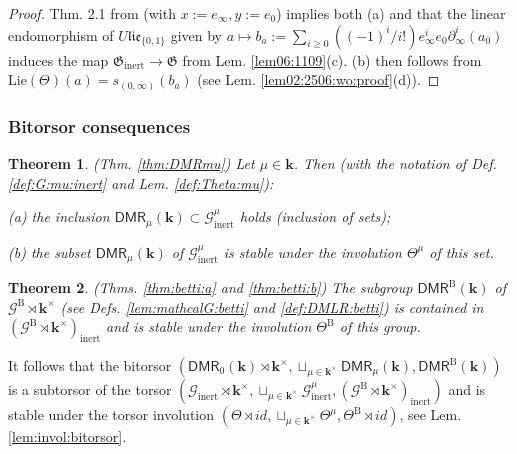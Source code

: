 \documentclass[10pt]{amsart}
\newtheorem{thm}{Theorem}[section]
\numberwithin{equation}{subsection}
\begin{document}
\begin{proof}
Thm. 2.1 from \cite{Sch1} (with $x:=e_\infty,y:=e_0$) implies both (a) and that 
the linear endomorphism of $U\mathfrak{lie}_{\{0,1\}}$ given by 
 $\textstyle a\mapsto b_a:=\sum_{i\geq0}((-1)^i/i!)e_\infty^ie_0\partial_\infty^i(a_0)$
induces the map $\mathfrak G_{\mathrm{inert}}\to \mathfrak G$ 
from Lem. \ref{lem06:1109}(c). (b) then follows from 
$\mathrm{Lie}(\Theta)(a)=s_{(0,\infty)}(b_a)$ (see Lem. \ref{lem02:2506:wo:proof}(d)). 
\end{proof}


\subsubsection{Bitorsor consequences}

\begin{thm}\label{thm:0:31:25jan} (Thm. \ref{thm:DMRmu})
  Let $\mu\in\mathbf k$. Then (with the notation of Def. \ref{def:G:mu:inert} 
  and Lem. \ref{def:Theta:mu}):
  
  (a) the inclusion $\mathsf{DMR}_\mu(\mathbf k)\subset\mathcal G^\mu_{\mathrm{inert}}$ holds
  (inclusion of sets); 
  
  (b) the subset $\mathsf{DMR}_\mu(\mathbf k)$ of $\mathcal G^\mu_{\mathrm{inert}}$ is stable 
  under the involution $\Theta^\mu$ of this set. 
\end{thm}
 
\begin{thm} \label{thm:0:33} (Thms. \ref{thm:betti:a} and \ref{thm:betti:b})
The subgroup $\mathsf{DMR}^{\mathrm B}(\mathbf k)$ of $\mathcal G^{\mathrm B}\rtimes\mathbf k^\times$
(see Defs. \ref{lem:mathcalG:betti} and \ref{def:DMLR:betti})
is contained in $(\mathcal G^{\mathrm B}\rtimes\mathbf k^\times)_{\mathrm{inert}}$ and is 
stable under the involution $\Theta^{\mathrm B}$ of this group. 
\end{thm}
It follows that the bitorsor $(\mathsf{DMR}_0(\mathbf k)\rtimes\mathbf k^\times,
\sqcup_{\mu\in\mathbf k^\times}\mathsf{DMR}_\mu(\mathbf k),
  \mathsf{DMR}^{\mathrm B}(\mathbf k))$ is a subtorsor of the torsor 
$(\mathcal G_{\mathrm{inert}} \rtimes \mathbf k^\times,
\sqcup_{\mu\in\mathbf k^\times}\mathcal G_{\mathrm{inert}}^\mu,
(\mathcal G^{\mathrm B} \rtimes \mathbf k^\times)_{\mathrm{inert}})$ and is stable 
under the torsor involution $(\Theta\rtimes id,\sqcup_{\mu\in\mathbf k^\times}\Theta^\mu,
\Theta^{\mathrm B}\rtimes id)$, see Lem. \ref{lem:invol:bitorsor}.
\end{document}
